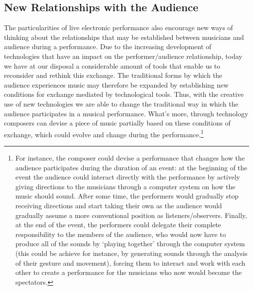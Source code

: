 \hypertarget{relaudience}{}
\subsection{New Relationships with the Audience}

The particularities of live electronic performance also encourage new ways of thinking about the relationships that may be established between musicians and audience during a performance. Due to the increasing development of technologies that have an impact on the performer/audience relationship, today we have at our disposal a considerable amount of tools that enable us to reconsider and rethink this exchange. The traditional forms by which the audience experiences music may therefore be expanded by establishing new conditions for exchange mediated by technological tools. Thus, with the creative use of new technologies we are able to change the traditional way in which the audience participates in a musical performance. What's more, through technology composers can devise a piece of music partially based on these conditions of exchange, which could evolve and change during the performance.\footnote{For instance, the composer could devise a performance that changes how the audience participates during the duration of an event: at the beginning of the event the audience could interact directly with the performance by actively giving directions to the musicians through a computer system on how the music should sound. After some time, the performers would gradually stop receiving directions and start taking their own as the audience would gradually assume a more conventional position as listeners/observers. Finally, at the end of the event, the performers could delegate their complete responsibility to the members of the audience, who would  now have to produce all of the sounds by `playing together' through the computer system (this could be achieve for instance, by generating sounds through the analysis of their gesture and movement), forcing them to interact and work with each other to create a performance for the musicians who now would become the spectators.}

